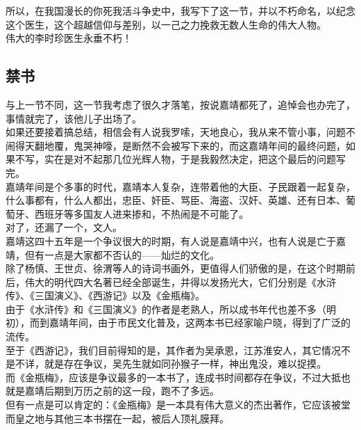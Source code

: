 \begin{multicols}{\theparacolNo}
所以，在我国漫长的你死我活斗争史中，我写下了这一节，并以不朽命名，以纪念这个医生，这个超越信仰与差别，以一己之力挽救无数人生命的伟大人物。\\

伟大的李时珍医生永垂不朽！\\

\subsection{禁书}
与上一节不同，这一节我考虑了很久才落笔，按说嘉靖都死了，追悼会也办完了，事情就完了，该他儿子出场了。\\

如果还要接着搞总结，相信会有人说我罗嗦，天地良心，我从来不管小事，问题不闹得天翻地覆，鬼哭神嚎，是断然不会被写下来的，而这嘉靖年间的最终问题，如果不写，实在是对不起那几位光辉人物，于是我毅然决定，把这个最后的问题写完。\\

嘉靖年间是个多事的时代，嘉靖本人复杂，连带着他的大臣、子民跟着一起复杂，什么事都有，什么人都出，忠臣、奸臣、骂臣、海盗、汉奸、英雄、还有日本、葡萄牙、西班牙等多国友人进来掺和，不热闹是不可能了。\\

对了，还漏了一个，文人。\\

嘉靖这四十五年是一个争议很大的时期，有人说是嘉靖中兴，也有人说是亡于嘉靖，但有一点是大家都不否认的——灿烂的文化。\\

除了杨慎、王世贞、徐渭等人的诗词书画外，更值得人们骄傲的是，在这个时期前后，伟大的明代四大名著已经全部诞生，并得以发扬光大，它们分别是《水浒传》、《三国演义》、《西游记》以及《金瓶梅》。\\

由于《水浒传》和《三国演义》的作者是老熟人，所以成书年代也差不多（明初），而到嘉靖年间，由于市民文化普及，这两本书已经家喻户晓，得到了广泛的流传。\\

至于《西游记》，我们目前得知的是，其作者为吴承恩，江苏淮安人，其它情况不是不详，就是存在争议，吴先生就如同孙猴子一样，神出鬼没，难以捉摸。\\

而《金瓶梅》，应该是争议最多的一本书了，连成书时间都存在争议，不过大抵也就是嘉靖后期到万历之前的这一段，跑不了多远。\\

但有一点是可以肯定的：《金瓶梅》是一本具有伟大意义的杰出著作，它应该被堂而皇之地与其他三本书摆在一起，被后人顶礼膜拜。\\


\end{multicols}
